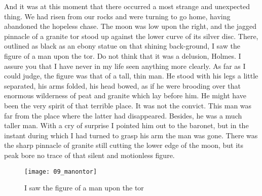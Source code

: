 \makeatother

And it was at this moment that there occurred a most strange and unexpected thing. We had risen from our rocks and were turning to go home, having abandoned the hopeless chase. The moon was low upon the right, and the jagged pinnacle of a granite tor stood up against the lower curve of its silver disc. There, outlined as black as an ebony statue on that shining back-ground, I saw the figure of a man upon the tor. Do not think that it was a delusion, Holmes. I assure you that I have never in my life seen anything more clearly. As far as I could judge, the figure was that of a tall, thin man. He stood with his legs a little separated, his arms folded, his head bowed, as if he were brooding over that enormous wilderness of peat and granite which lay before him. He might have been the very spirit of that terrible place. It was not the convict. This man was far from the place where the latter had disappeared. Besides, he was a much taller man. With a cry of surprise I pointed him out to the baronet, but in the instant during which I had turned to grasp his arm the man was gone. There was the sharp pinnacle of granite still cutting the lower edge of the moon, but its peak bore no trace of that silent and motionless figure.

\makeatletter
{}
{%

}{%
	\begin{figure}[p]
	\centering
	\texttt{[image: 09\_manontor]}
	\caption{I saw the figure of a man upon the tor}
	\end{figure}
}

\makeatother



